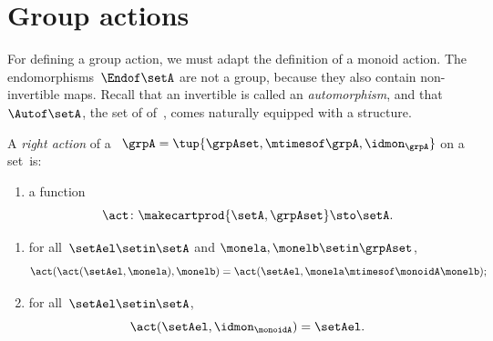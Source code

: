 
\section{Group actions}


For defining a group action, we must adapt the definition of a monoid action.
The endomorphisms~$\Endof\setA$ are not a group, because they also contain non-invertible maps.
Recall that an invertible  is called an \emph{automorphism}, and that~$\Autof\setA$, the set of  of~\setA, comes naturally equipped with a  structure.


\begin{ctdefinition}
    \label{def:group-right-action-operation}
    A \emph{right action} of a ~$\grpA = \tup{\grpAset, \mtimesof\grpA, \idmon_\grpA}$ on a set~\setA is:

    \constit
    \begin{enumerate}
        \item a function
              \begin{equation}
                  \label{eq:ract-group}
                  \act \colon \makecartprod{\setA, \grpAset} \sto \setA.
              \end{equation}
    \end{enumerate}
    \condit
    \begin{enumerate}
        \item for all~$\setAel \setin \setA$ and $\monela,\monelb\setin\grpAset$,
              \begin{equation}
                  \label{eq:group-ract-1cond}
                  \act(\act(\setAel,\monela), \monelb) = \act(\setAel, \monela \mtimesof\monoidA \monelb);
              \end{equation}
        \item for all~$\setAel \setin \setA$,
              \begin{equation}
                  \label{eq:group-ract-2cond}
                  \act(\setAel, \idmon_\monoidA) = \setAel.
              \end{equation}
    \end{enumerate}
\end{ctdefinition}

